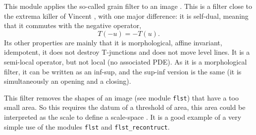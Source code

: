This module applies the so-called grain filter to an image \cite{masnou.morel:image}
.
This is a filter close to the extrema killer 
of Vincent \cite{vincent:grayscale}, with
one major difference: it is self-dual, meaning that it commutes with the
negative operator,
$$
T(-u) = -T(u).
$$
Its other properties are mainly that it is morphological, affine invariant,
idempotent,
it does not destroy T-junctions and does not move level lines. It is a
semi-local operator, but not local (no associated PDE).
As it is a morphological filter, it can be written as an inf-sup, and the
sup-inf version is the same (it is simultaneously an opening and a closing).

This filter removes the shapes of an image (see module \verb+flst+) that
have a too small area. So this requires the datum of a threshold of area, this
area could be interpreted as the scale to define a scale-space
\cite{monasse.guichard:scale-space}\cite{monasse.guichard:fast}.
It is a good example of a very simple use of the modules \verb+flst+ and
\verb+flst_recontruct+.

